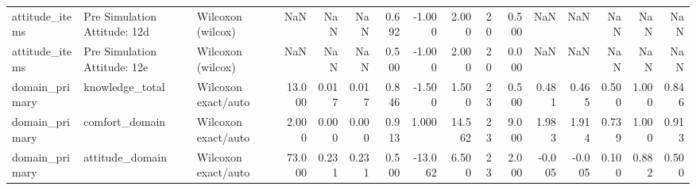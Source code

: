 \begin{tabular}{lllrrrrrrrrrrrrr}
attitude_items & Pre Simulation Attitude: 12d & Wilcoxon (wilcox) & NaN & NaN & NaN & 0.692 & -1.000 & 2.000 & 20 & 0.500 & NaN & NaN & NaN & NaN & NaN \\
attitude_items & Pre Simulation Attitude: 12e & Wilcoxon (wilcox) & NaN & NaN & NaN & 0.500 & -1.000 & 2.000 & 20 & 0.000 & NaN & NaN & NaN & NaN & NaN \\
domain_primary & knowledge_total & Wilcoxon exact/auto & 13.000 & 0.017 & 0.017 & 0.846 & -1.500 & 1.500 & 23 & 0.500 & 0.481 & 0.465 & 0.500 & 1.000 & 0.846 \\
domain_primary & comfort_domain & Wilcoxon exact/auto & 2.000 & 0.000 & 0.000 & 0.913 & 1.000 & 14.562 & 23 & 9.000 & 1.983 & 1.914 & 0.739 & 1.000 & 0.913 \\
domain_primary & attitude_domain & Wilcoxon exact/auto & 73.000 & 0.231 & 0.231 & 0.500 & -13.062 & 6.500 & 23 & 2.000 & -0.005 & -0.005 & 0.100 & 0.882 & 0.500 \\
\bottomrule
\end{tabular}
